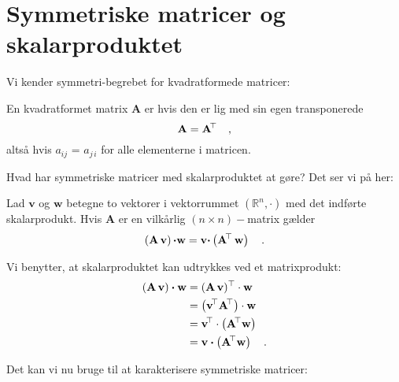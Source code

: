 \section{Symmetriske matricer og skalarproduktet}


Vi kender symmetri-begrebet for kvadratformede matricer:

\begin{definition}
En kvadratformet matrix $\mathbf{A}$ er  hvis den er lig med sin egen transponerede
\begin{equation}
\mathbf{A} = \mathbf{A}\hspace*{-.6mm}^{\top} \quad ,
\end{equation}
altså hvis $a_{ij}$ = $a_{j\,i}$ for alle elementerne i matricen.
\end{definition}


Hvad har symmetriske matricer med skalarproduktet at gøre? Det ser vi på her:


\begin{theorem}
Lad $\mathbf{v}$ og $\mathbf{w}$ betegne to vektorer i vektorrummet $(\mathbb{R}^{n}, \bm{\cdot})$ med det indførte skalarprodukt. Hvis $\mathbf{A}$ er en vilkårlig
$(n \times n)-$matrix gælder
\begin{equation} \label{eqMatDot}
\left(\mathbf{A}\,\mathbf{v} \right){\bm{\cdot}} \mathbf{w} = \mathbf{v} {\bm{\cdot}} \left(\mathbf{A}\hspace*{-.6mm}^{\top}\,\mathbf{w}\right) \quad .
\end{equation}
\end{theorem}

\begin{bevis}
Vi benytter, at skalarproduktet kan udtrykkes ved et matrixprodukt:
\begin{equation}
\begin{aligned}
\left(\mathbf{A}\,\mathbf{v} \right)\bm{\cdot} \mathbf{w} &= \left(\mathbf{A}\,\mathbf{v} \right)\hspace*{-.6mm}^{\top} \cdot \mathbf{w} \\
&= \left(\mathbf{v}\hspace*{-.6mm}^{\top} \mathbf{A}\hspace*{-.6mm}^{\top}  \right) \cdot \mathbf{w} \\
&= \mathbf{v}\hspace*{-.6mm}^{\top} \cdot \left(\mathbf{A}\hspace*{-.6mm}^{\top}  \mathbf{w}  \right) \\
&= \mathbf{v} \bm{\cdot} \left(\mathbf{A}\hspace*{-.6mm}^{\top}  \mathbf{w}  \right) \quad .
\end{aligned}
\end{equation}
\end{bevis}

Det kan vi nu bruge til at karakterisere symmetriske matricer:

